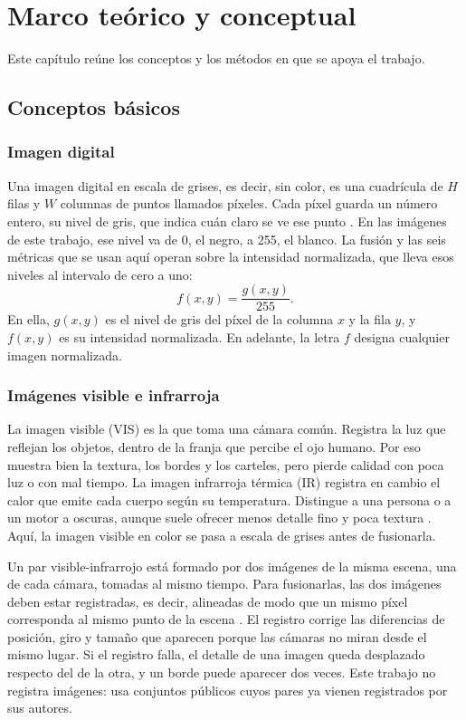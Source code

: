 \chapter{Marco teórico y conceptual}
\label{cap:marco}

Este capítulo reúne los conceptos y los métodos en que se apoya el trabajo.

\section{Conceptos básicos}
\label{sec:conceptos}

\subsection{Imagen digital}

Una imagen digital en escala de grises, es decir, sin color, es una cuadrícula de $H$ filas y $W$
columnas de puntos llamados píxeles. Cada píxel guarda un número entero, su nivel de gris, que indica
cuán claro se ve ese punto \parencite{gonzalez2018}. En las imágenes de este trabajo, ese nivel va de 0,
el negro, a 255, el blanco. La fusión y las seis métricas que se usan aquí operan sobre la intensidad
normalizada, que lleva esos niveles al intervalo de cero a uno:
\begin{equation} f(x,y) = \frac{g(x,y)}{255}. \label{eq:intensidad} \end{equation}
En ella, $g(x,y)$ es el nivel de gris del píxel de la columna $x$ y la fila $y$, y $f(x,y)$ es su
intensidad normalizada. En adelante, la letra $f$ designa cualquier imagen normalizada.

\subsection{Imágenes visible e infrarroja}

La imagen visible (VIS) es la que toma una cámara común. Registra la luz que reflejan los objetos,
dentro de la franja que percibe el ojo humano. Por eso muestra bien la textura, los bordes y los
carteles, pero pierde calidad con poca luz o con mal tiempo. La imagen infrarroja térmica (IR) registra
en cambio el calor que emite cada cuerpo según su temperatura. Distingue a una persona o a un motor a
oscuras, aunque suele ofrecer menos detalle fino y poca textura \parencite{ma2019, bajacfigueredo2024}.
Aquí, la imagen visible en color se pasa a escala de grises antes de fusionarla.

Un par visible-infrarrojo está formado por dos imágenes de la misma escena, una de cada cámara, tomadas
al mismo tiempo. Para fusionarlas, las dos imágenes deben estar registradas, es decir, alineadas de modo
que un mismo píxel corresponda al mismo punto de la escena \parencite{gonzalez2018}. El registro corrige
las diferencias de posición, giro y tamaño que aparecen porque las cámaras no miran desde el mismo lugar.
Si el registro falla, el detalle de una imagen queda desplazado respecto del de la otra, y un borde puede
aparecer dos veces. Este trabajo no registra imágenes: usa conjuntos públicos cuyos pares ya vienen
registrados por sus autores.

